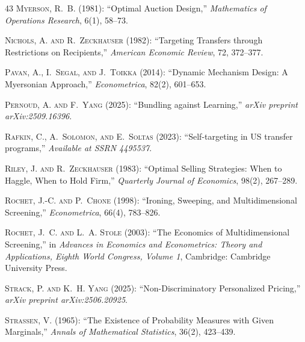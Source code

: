 \documentclass[12pt,letterpaper]{article}
\theoremstyle{plain}
\theoremstyle{definition}
\theoremstyle{remark}
\renewcommand{\1}{\mathds{1}}
\theoremstyle{definition}
\begin{document}
\begin{thebibliography}{43}
\textsc{Myerson, R.~B.} (1981): \enquote{{Optimal Auction Design},} \emph{Mathematics of Operations Research}, 6(1), 58--73.

\textsc{Nichols, A. and R.~Zeckhauser} (1982): \enquote{{Targeting Transfers through Restrictions on Recipients},} \emph{American Economic Review}, 72, 372--377.

\textsc{Pavan, A., I.~Segal, and J.~Toikka} (2014): \enquote{{Dynamic Mechanism Design: A Myersonian Approach},} \emph{Econometrica}, 82(2), 601--653.

\textsc{Pernoud, A. and F.~Yang} (2025): \enquote{Bundling against Learning,} \emph{arXiv preprint arXiv:2509.16396}.

\textsc{Rafkin, C., A.~Solomon, and E.~Soltas} (2023): \enquote{Self-targeting in US transfer programs,} \emph{Available at SSRN 4495537}.

\textsc{Riley, J. and R.~Zeckhauser} (1983): \enquote{Optimal Selling Strategies: When to Haggle, When to Hold Firm,} \emph{Quarterly Journal of Economics}, 98(2), 267--289.

\textsc{Rochet, J.-C. and P.~Chone} (1998): \enquote{Ironing, Sweeping, and Multidimensional Screening,} \emph{Econometrica}, 66(4), 783--826.

\textsc{Rochet, J.~C. and L.~A. Stole} (2003): \enquote{{The Economics of Multidimensional Screening},} in \emph{Advances in Economics and Econometrics: Theory and Applications, Eighth World Congress, Volume 1}, Cambridge: Cambridge University Press.

\textsc{Strack, P. and K.~H. Yang} (2025): \enquote{Non-Discriminatory Personalized Pricing,} \emph{arXiv preprint arXiv:2506.20925}.

\textsc{Strassen, V.} (1965): \enquote{{The Existence of Probability Measures with Given Marginals},} \emph{Annals of Mathematical Statistics}, 36(2), 423--439.


\end{thebibliography}
\end{document}
